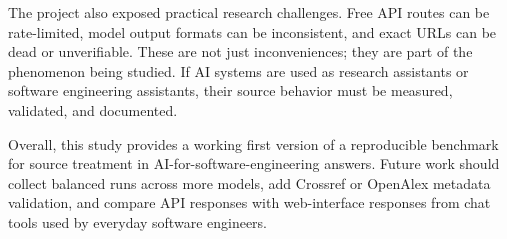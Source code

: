 \documentclass[acmsmall,review,nonacm]{acmart}
\begin{document}
The project also exposed practical research challenges. Free API routes can be
rate-limited, model output formats can be inconsistent, and exact URLs can be
dead or unverifiable. These are not just inconveniences; they are part of the
phenomenon being studied. If AI systems are used as research assistants or
software engineering assistants, their source behavior must be measured,
validated, and documented.

Overall, this study provides a working first version of a reproducible
benchmark for source treatment in AI-for-software-engineering answers. Future
work should collect balanced runs across more models, add Crossref or OpenAlex
metadata validation, and compare API responses with web-interface responses
from chat tools used by everyday software engineers.



\end{document}
